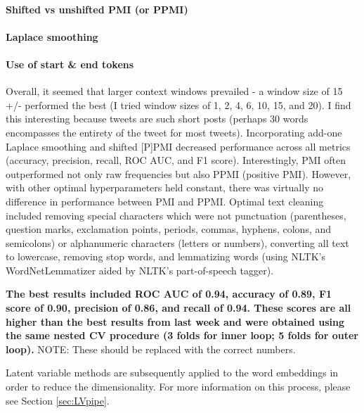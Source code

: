 \documentclass{article}
\begin{document}
\hypertarget{shifted-vs-unshifted-pmi-or-ppmi}{%
\paragraph{Shifted vs unshifted PMI (or
PPMI)}\label{shifted-vs-unshifted-pmi-or-ppmi}}

\hypertarget{laplace-smoothing}{%
\paragraph{Laplace smoothing}\label{laplace-smoothing}}

\hypertarget{use-of-start-end-tokens}{%
\paragraph{Use of start \& end tokens}\label{use-of-start-end-tokens}}

Overall, it seemed that larger context windows prevailed - a window size
of 15 +/- performed the best (I tried window sizes of 1, 2, 4, 6, 10,
15, and 20). I find this interesting because tweets are such short posts
(perhaps 30 words encompasses the entirety of the tweet for most
tweets). Incorporating add-one Laplace smoothing and shifted {[}P{]}PMI
decreased performance across all metrics (accuracy, precision, recall,
ROC AUC, and F1 score). Interestingly, PMI often outperformed not only
raw frequencies but also PPMI (positive PMI). However, with other
optimal hyperparameters held constant, there was virtually no difference
in performance between PMI and PPMI. Optimal text cleaning included
removing special characters which were not punctuation (parentheses,
question marks, exclamation points, periods, commas, hyphens, colons,
and semicolons) or alphanumeric characters (letters or numbers),
converting all text to lowercase, removing stop words, and lemmatizing
words (using NLTK's WordNetLemmatizer aided by NLTK's part-of-speech
tagger).

\textbf{The best results included ROC AUC of 0.94, accuracy of 0.89, F1
score of 0.90, precision of 0.86, and recall of 0.94. These scores are
all higher than the best results from last week and were obtained using
the same nested CV procedure (3 folds for inner loop; 5 folds for outer
loop).} NOTE: These should be replaced with the correct numbers.

Latent variable methods are subsequently applied to the word embeddings
in order to reduce the dimensionality. For more information on this
process, please see Section \ref{sec:LVpipe}.
\end{document}
